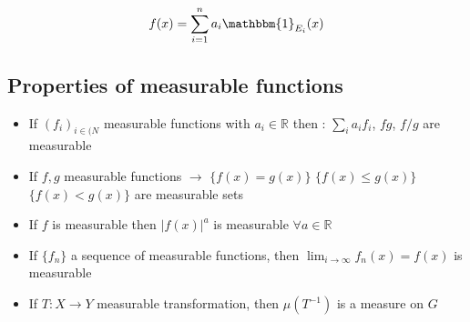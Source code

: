 \begin{align} f(x) = \sum_{i=1}^na_i\mathbbm{1}_{E_i}(x)\end{align}

\subsection{Properties of measurable functions}
\begin{itemize}
\item If $(f_i)_{i\in\mathbb({N}}$ measurable functions with $a_i \in \mathbb{R}$ then : $\sum_i a_if_i$, $fg$, $f/g$  are measurable
\item If $f,g$ measurable functions $\rightarrow$ $\{f(x) = g(x)\}$ $\{f(x) \leq g(x)\}$ $\{f(x) < g(x)\}$ are measurable sets
\item If $f$ is measurable then $|f(x)|^a$ is measurable $\forall a \in \mathbb{R}$
\item If $\{f_n\}$ a sequence of measurable functions, then $\lim_{i \rightarrow \infty}f_n(x) = f(x)$ is measurable
\item If $T:X \rightarrow Y$ measurable transformation, then $\mu(T^{-1})$ is a measure on $G$
\end{itemize}
